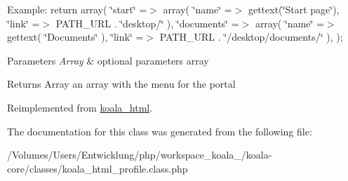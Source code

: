 Example: return array( \char`\"{}start\char`\"{} =$>$ array( \char`\"{}name\char`\"{} =$>$ gettext(\char`\"{}Start page\char`\"{}), \char`\"{}link\char`\"{} =$>$ PATH\_\-URL . \char`\"{}desktop/\char`\"{} ), \char`\"{}documents\char`\"{} =$>$ array( \char`\"{}name\char`\"{} =$>$ gettext( \char`\"{}Documents\char`\"{} ), \char`\"{}link\char`\"{} =$>$ PATH\_\-URL . \char`\"{}/desktop/documents/\char`\"{} ), );


\begin{DoxyParams}{Parameters}
{\em Array} & optional parameters array \\
\hline
\end{DoxyParams}
\begin{DoxyReturn}{Returns}
Array an array with the menu for the portal 
\end{DoxyReturn}


Reimplemented from \hyperlink{classkoala__html_a2cb528d682a53d70fe407cee50adf689}{koala\_\-html}.



The documentation for this class was generated from the following file:\begin{DoxyCompactItemize}
\item 
/Volumes/Users/Entwicklung/php/workspace\_\-koala\_/koala-\/core/classes/koala\_\-html\_\-profile.class.php\end{DoxyCompactItemize}
